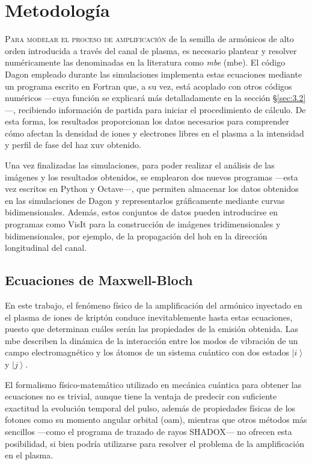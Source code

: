 \chapter{Metodología}\label{cap:3}
\lettrine{P}{ara modelar el proceso de amplificación} de la semilla de armónicos de alto orden introducida a través del canal de plasma, es necesario plantear y resolver numéricamente las denominadas en la literatura como \emph{\acrlong{mbe}} (\acrshort{mbe}). El código Dagon empleado durante las simulaciones implementa estas ecuaciones mediante un programa escrito en Fortran que, a su vez, está acoplado con otros códigos numéricos ---cuya función se explicará más detalladamente en la sección \S\ref{sec:3.2}---, recibiendo información de partida para iniciar el procedimiento de cálculo. De esta forma, los resultados proporcionan los datos necesarios para comprender cómo afectan la densidad de iones y electrones libres en el plasma a la intensidad y perfil de fase del haz \acrshort{xuv} obtenido. 

Una vez finalizadas las simulaciones, para poder realizar el análisis de las imágenes y los resultados obtenidos, se emplearon dos nuevos programas ---esta vez escritos en Python y Octave---, que permiten almacenar los datos obtenidos en las simulaciones de Dagon y representarlos gráficamente mediante curvas bidimensionales. Además, estos conjuntos de datos pueden introducirse en programas como VisIt para la construcción de imágenes tridimensionales y bidimensionales, por ejemplo, de la propagación del \acrshort{hoh} en la dirección longitudinal del canal.

\section{Ecuaciones de Maxwell-Bloch}\label{sec:3.1}
En este trabajo, el fenómeno físico de la amplificación del armónico inyectado en el plasma de iones de kriptón conduce inevitablemente hasta estas ecuaciones, puesto que determinan cuáles serán las propiedades de la emisión obtenida. Las \acrshort{mbe} describen la dinámica de la interacción entre los modos de vibración de un campo electromagnético y los átomos de un sistema cuántico con dos estados $\left|i\right\rangle$ y $\left|j\right\rangle$. 

El formalismo físico-matemático utilizado en mecánica cuántica para obtener las ecuaciones no es trivial\autocite{cohen-tannoudjiQuantumMechanicsVolume2019,cohen-tannoudjiQuantumMechanicsVolume2019a,Sakurai2020,milonniLasers1988}, aunque tiene la ventaja de predecir con suficiente exactitud la evolución temporal del pulso, además de propiedades físicas de los fotones como su momento angular orbital (\acrshort{oam}), mientras que otros métodos más sencillos ---como el programa de trazado de rayos SHADOX--- no ofrecen esta posibilidad, si bien podría utilizarse para resolver el problema de la amplificación en el plasma. 

